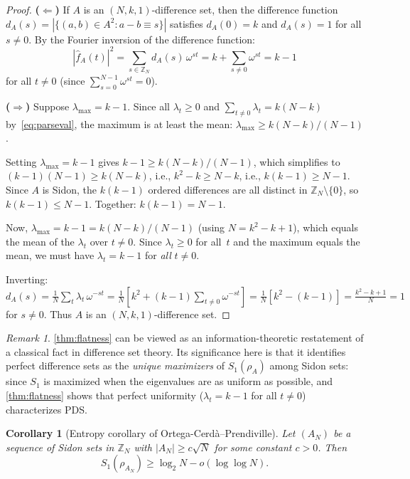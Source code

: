 \documentclass[11pt]{article}
\newtheorem{corollary}[theorem]{Corollary}
\theoremstyle{definition}
\theoremstyle{remark}
\newtheorem{remark}[theorem]{Remark}
\newcommand{\Z}{\mathbb{Z}}
\newcommand{\fhat}{\widehat{f}}
\newcommand{\lmax}{\lambda_{\max}}
\begin{document}
\begin{proof}
\textbf{($\Leftarrow$)}
If $A$ is an $(N,k,1)$-difference set, then the difference function
$d_A(s) = |\{(a,b) \in A^2 : a - b \equiv s\}|$ satisfies $d_A(0) = k$
and $d_A(s) = 1$ for all $s \ne 0$.  By the Fourier inversion of
the difference function:
\[
  |\fhat_A(t)|^2 = \sum_{s \in \Z_N} d_A(s)\, \omega^{st}
  = k + \sum_{s \ne 0} \omega^{st} = k - 1
\]
for all $t \ne 0$ (since $\sum_{s=0}^{N-1} \omega^{st} = 0$).

\textbf{($\Rightarrow$)}
Suppose $\lmax = k-1$.  Since all $\lambda_t \ge 0$ and
$\sum_{t \ne 0} \lambda_t = k(N-k)$ by~\eqref{eq:parseval},
the maximum is at least the mean:
$\lmax \ge k(N-k)/(N-1)$.

Setting $\lmax = k-1$ gives $k - 1 \ge k(N-k)/(N-1)$, which
simplifies to $(k-1)(N-1) \ge k(N-k)$, i.e., $k^2 - k \ge N - k$,
i.e., $k(k-1) \ge N - 1$.  Since $A$ is Sidon, the $k(k-1)$
ordered differences are all distinct in $\Z_N \setminus \{0\}$,
so $k(k-1) \le N - 1$.  Together: $k(k-1) = N - 1$.

Now, $\lmax = k - 1 = k(N-k)/(N-1)$ (using $N = k^2 - k + 1$),
which equals the mean of the $\lambda_t$ over $t \ne 0$.  Since
$\lambda_t \ge 0$ for all~$t$ and the maximum equals the mean, we
must have $\lambda_t = k - 1$ for \emph{all} $t \ne 0$.

Inverting: $d_A(s) = \frac{1}{N}\sum_t \lambda_t\, \omega^{-st}
= \frac{1}{N}[k^2 + (k-1)\sum_{t \ne 0}\omega^{-st}]
= \frac{1}{N}[k^2 - (k-1)] = \frac{k^2-k+1}{N} = 1$
for $s \ne 0$.  Thus $A$ is an $(N,k,1)$-difference set.
\end{proof}

\begin{remark}
\cref{thm:flatness} can be viewed as an information-theoretic
restatement of a classical fact in difference set theory.
Its significance here is that it identifies perfect difference sets
as the \emph{unique maximizers} of $S_1(\rho_A)$ among Sidon sets:
since $S_1$ is maximized when the eigenvalues are as uniform as
possible, and \cref{thm:flatness} shows that perfect uniformity
($\lambda_t = k-1$ for all $t \ne 0$) characterizes PDS.
\end{remark}

\begin{corollary}[Entropy corollary of Ortega-Cerd\`a--Prendiville]
\label{cor:OP-entropy}
Let $(A_N)$ be a sequence of Sidon sets in $\Z_N$ with
$|A_N| \ge c\sqrt{N}$ for some constant $c > 0$.  Then
\[
  S_1(\rho_{A_N}) \ge \log_2 N - o(\log\log N).
\]
\end{corollary}
\end{document}
